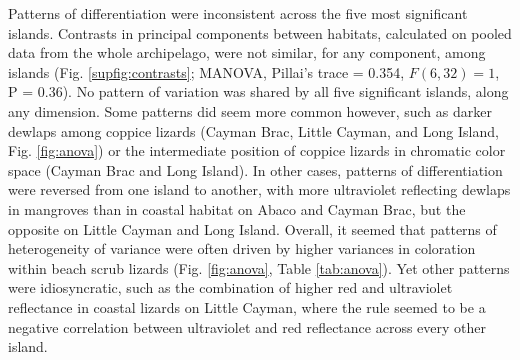 Patterns of differentiation were inconsistent across the five most significant islands. Contrasts in principal components between habitats, calculated on pooled data from the whole archipelago, were not similar, for any component, among islands (Fig. \ref{supfig:contrasts}; MANOVA, Pillai's trace = 0.354, $F(6, 32) = 1$, P = 0.36). No pattern of variation was shared by all five significant islands, along any dimension. Some patterns did seem more common however, such as darker dewlaps among coppice lizards (Cayman Brac, Little Cayman, and Long Island, Fig. \ref{fig:anova}) or the intermediate position of coppice lizards in chromatic color space (Cayman Brac and Long Island). In other cases, patterns of differentiation were reversed from one island to another, with more ultraviolet reflecting dewlaps in mangroves than in coastal habitat on Abaco and Cayman Brac, but the opposite on Little Cayman and Long Island. Overall, it seemed that patterns of heterogeneity of variance were often driven by higher variances in coloration within beach scrub lizards (Fig. \ref{fig:anova}, Table \ref{tab:anova}). Yet other patterns were idiosyncratic, such as the combination of higher red and ultraviolet reflectance in coastal lizards on Little Cayman, where the rule seemed to be a negative correlation between ultraviolet and red reflectance across every other island.\\
